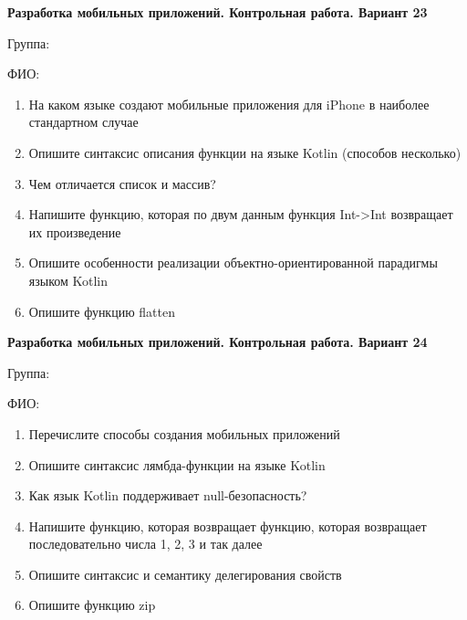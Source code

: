 \documentclass[12pt]{article}
\begin{document}
\newpage\begin{minipage}{\textwidth}
\textbf{Разработка мобильных приложений. Контрольная работа. Вариант 23}

Группа: \underline{\hspace{3cm}}

ФИО: \underline{\hspace{10cm}}

\begin{enumerate}
\item На каком языке создают мобильные приложения для iPhone в наиболее стандартном случае
\item Опишите синтаксис описания функции на языке Kotlin (способов несколько)
\item Чем отличается список и массив?
\item Напишите функцию, которая по двум данным функция Int->Int возвращает их произведение
\item Опишите особенности реализации объектно-ориентированной парадигмы языком Kotlin
\item Опишите функцию flatten

\end{enumerate}
\end{minipage}

\newpage\begin{minipage}{\textwidth}
\textbf{Разработка мобильных приложений. Контрольная работа. Вариант 24}

Группа: \underline{\hspace{3cm}}

ФИО: \underline{\hspace{10cm}}

\begin{enumerate}
\item Перечислите способы создания мобильных приложений
\item Опишите синтаксис лямбда-функции на языке Kotlin
\item Как язык Kotlin поддерживает null-безопасность?
\item Напишите функцию, которая возвращает функцию, которая возвращает последовательно числа 1, 2, 3 и так далее
\item Опишите синтаксис и семантику делегирования свойств
\item Опишите функцию zip

\end{enumerate}
\end{minipage}
\end{document}

